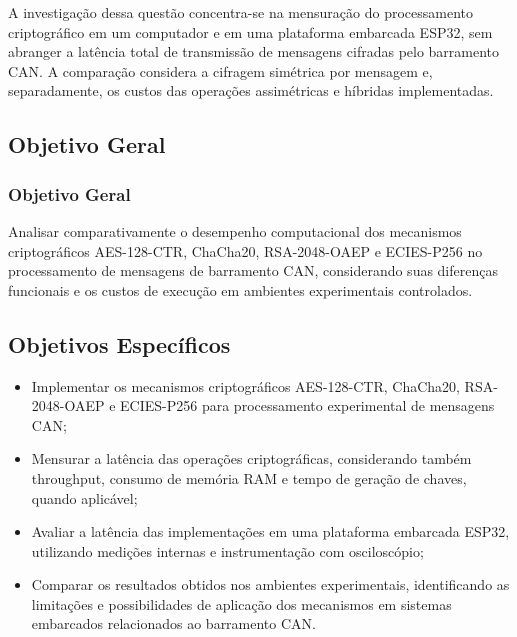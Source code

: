 A investigação dessa questão concentra-se na mensuração do processamento criptográfico em um computador e em uma plataforma embarcada ESP32, sem abranger a latência total de transmissão de mensagens cifradas pelo barramento CAN. A comparação considera a cifragem simétrica por mensagem e, separadamente, os custos das operações assimétricas e híbridas implementadas.


\subsection{Objetivo Geral}\label{subsec:objetivosgerais}

\subsubsection{Objetivo Geral}

Analisar comparativamente o desempenho computacional dos mecanismos criptográficos AES-128-CTR, ChaCha20, RSA-2048-OAEP e ECIES-P256 no processamento de mensagens de barramento CAN, considerando suas diferenças funcionais e os custos de execução em ambientes experimentais controlados.

\subsection{Objetivos Específicos}
\begin{itemize}    
    \item Implementar os mecanismos criptográficos AES-128-CTR, ChaCha20, RSA-2048-OAEP e ECIES-P256 para processamento experimental de mensagens CAN;
    
    \item Mensurar a latência das operações criptográficas, considerando também throughput, consumo de memória RAM e tempo de geração de chaves, quando aplicável;

    \item Avaliar a latência das implementações em uma plataforma embarcada ESP32, utilizando medições internas e instrumentação com osciloscópio;
    
    \item Comparar os resultados obtidos nos ambientes experimentais, identificando as limitações e possibilidades de aplicação dos mecanismos em sistemas embarcados relacionados ao barramento CAN.

\end{itemize}

